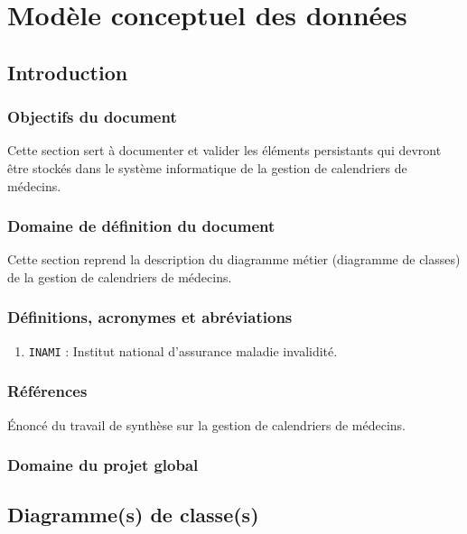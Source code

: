 \documentclass[a4paper, 11pt]{report}
\begin{document}

\tableofcontents

\chapter{Modèle conceptuel des données}

\section{Introduction}

\subsection{Objectifs du document}

Cette section sert à documenter et valider les éléments persistants qui devront
être stockés dans le système informatique de la gestion de calendriers de médecins.

\subsection{Domaine de définition du document}

Cette section reprend la description du diagramme métier (diagramme de classes) de la gestion de 
calendriers de médecins.

\subsection{Définitions, acronymes et abréviations}

\begin{enumerate}

\item \texttt{INAMI} : Institut national d'assurance maladie invalidité.

\end{enumerate}

\subsection{Références}

Énoncé du travail de synthèse sur la gestion de calendriers de médecins.

\subsection{Domaine du projet global}
\newpage
\section{Diagramme(s) de classe(s)}
\end{document}
